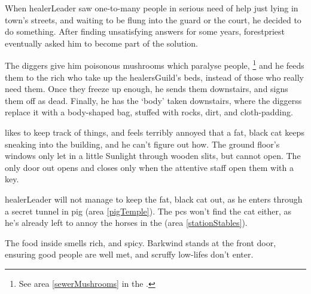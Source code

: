 \begin{multicols}{2}
\begin{exampletext}
  When \gls{healerLeader} saw one-to-many people in serious need of help just lying in \gls{town}'s streets, and waiting to be flung into the \gls{guard} or the \gls{court}, he decided to do something.
  After finding unsatisfying answers for some years, \gls{forestpriest} eventually asked him to become part of the solution.

  The \gls{diggers} give him poisonous mushrooms which paralyse people,
  \footnote{See area \vref{sewerMushrooms} in the .}
  and he feeds them to the rich who take up the \gls{healersGuild}'s beds, instead of those who really need them.
  Once they freeze up enough, he sends them downstairs, and signs them off as dead.
  Finally, he has the `body' taken downstairs, where the \glspl{diggers} replace it with a body-shaped bag, stuffed with rocks, dirt, and cloth-padding.
\end{exampletext}

 likes to keep track of things, and feels terribly annoyed that a fat, black cat keeps sneaking into the building, and he can't figure out how.
The ground floor's windows only let in a little Sunlight through wooden slits, but cannot open.
The only door out opens and closes only when the attentive staff open them with a key.

\Gls{healerLeader} will not manage to keep the fat, black cat out, as he enters through a secret tunnel in \gls{pig} (area \vref{pigTemple}).
The \glspl{pc} won't find the cat either, as he's already left to annoy the horses in the  (area \vref{stationStables}).

\healerLeader

The food inside smells rich, and spicy.
Barkwind stands at the front door, ensuring good people are well met, and scruffy low-lifes don't enter.



\end{multicols}
